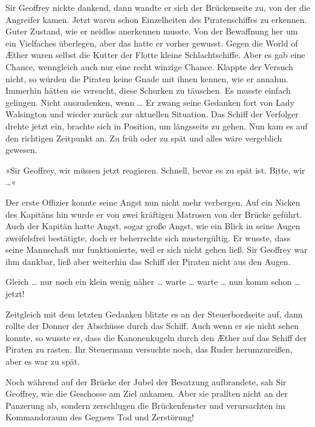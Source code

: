 \bigpar

Sir Geoffrey nickte dankend, dann wandte er sich der Brückenseite
zu, von der die Angreifer kamen. Jetzt waren schon Einzelheiten des
Piratenschiffes zu erkennen. Guter Zustand, wie er neidlos
anerkennen musste. Von der Bewaffnung her um ein Vielfaches
überlegen, aber das hatte er vorher gewusst. Gegen die World of
Æther waren selbst die Kutter der Flotte kleine Schlachtschiffe.
Aber es gab eine Chance, wenngleich auch nur eine recht winzige
Chance. Klappte der Versuch nicht, so würden die Piraten keine
Gnade mit ihnen kennen, wie er annahm. Immerhin hätten sie
versucht, diese Schurken zu täuschen. Es musste einfach gelingen.
Nicht auszudenken, wenn \ldots{} Er zwang seine Gedanken fort von Lady
Walsington und wieder zurück zur aktuellen Situation. Das Schiff
der Verfolger drehte jetzt ein, brachte sich in Position, um
längsseits zu gehen. Nun kam es auf den richtigen Zeitpunkt an. Zu
früh oder zu spät und alles wäre vergeblich gewesen.

\bigpar

»Sir Geoffrey, wir müssen jetzt reagieren. Schnell, bevor es zu
spät ist. Bitte, wir \ldots{}«

Der erste Offizier konnte seine Angst nun nicht mehr verbergen. Auf
ein Nicken des Kapitäns hin wurde er von zwei kräftigen Matrosen
von der Brücke geführt. Auch der Kapitän hatte Angst, sogar große
Angst, wie ein Blick in seine Augen zweifelsfrei bestätigte, doch
er beherrschte sich mustergültig. Er wusste, dass seine Mannschaft
nur funktionierte, weil er sich nicht gehen ließ. Sir Geoffrey war
ihm dankbar, ließ aber weiterhin das Schiff der Piraten nicht aus
den Augen.

\bigpar

Gleich \ldots{} nur noch ein klein wenig näher \ldots{} warte \ldots{} warte \ldots{}
nun komm schon \ldots{} jetzt!

Zeitgleich mit dem letzten Gedanken blitzte es an der
Steuerbordseite auf, dann rollte der Donner der Abschüsse durch das
Schiff. Auch wenn er sie nicht sehen konnte, so wusste er, dass die
Kanonenkugeln durch den Æther auf das Schiff der Piraten zu rasten.
Ihr Steuermann versuchte noch, das Ruder herumzureißen, aber es war
zu spät.

Noch während auf der Brücke der Jubel der Besatzung aufbrandete,
sah Sir Geoffrey, wie die Geschosse am Ziel ankamen. Aber sie
prallten nicht an der Panzerung ab, sondern zerschlugen die
Brückenfenster und verursachten im Kommandoraum des Gegners Tod und
Zerstörung!

